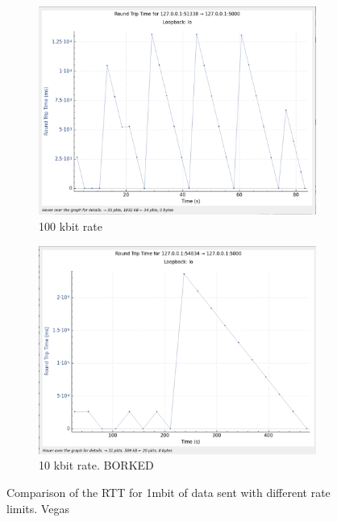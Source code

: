 \documentclass{report}
\begin{document}
\begin{figure}[H]
    \begin{subfigure}[b]{0.45\textwidth}
        \centering
        \includegraphics[width=\textwidth]{Pics/Vegas/r100kbit_s1m_rtt}
        \caption{100 kbit rate}
    \end{subfigure}
    \hfill
    \begin{subfigure}[b]{0.45\textwidth}
        \centering
        \includegraphics[width=\textwidth]{Pics/Vegas/r10kbit_s1m_rtt}
        \caption{10 kbit rate. BORKED}
    \end{subfigure}
    \caption{Comparison of the RTT for 1mbit of data sent with different rate limits. Vegas}
    \label{fig:four_images}
\end{figure}
\end{document}
